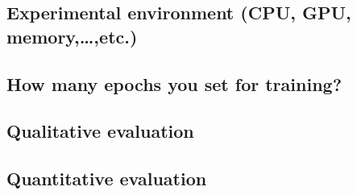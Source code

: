 \documentclass{beamer}
\begin{document}
\begin{CJK}{UTF8}{nkai}
\subsection{Experimental environment (CPU, GPU, memory,…,etc.)}
\subsection{How many epochs you set for training?}
\subsection{Qualitative evaluation}
\subsection{Quantitative evaluation}



\end{CJK}
\end{document}
